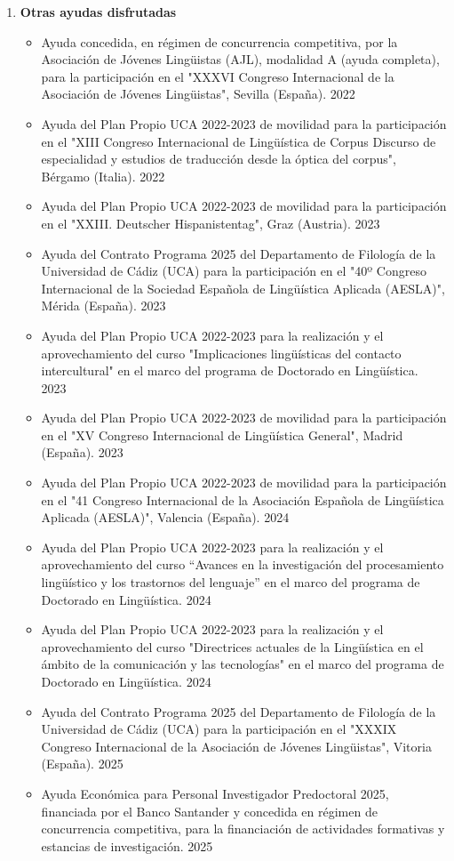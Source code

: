 \begin{enumerate}[label=\alph*)]
\begin{enumerate}[label=\alph*)]
\item \textbf{Otras ayudas disfrutadas}
\begin{itemize}
    \item Ayuda concedida, en régimen de concurrencia competitiva, por la Asociación de Jóvenes Lingüistas (AJL), modalidad A (ayuda completa), para la participación en el "XXXVI Congreso Internacional de la Asociación de Jóvenes Lingüistas", Sevilla (España). \hfill 2022
    \item Ayuda del Plan Propio UCA 2022-2023 de movilidad para la participación en el "XIII Congreso Internacional de Lingüística de Corpus Discurso de especialidad y estudios de traducción desde la óptica del corpus", Bérgamo (Italia). \hfill 2022
    \item Ayuda del Plan Propio UCA 2022-2023 de movilidad para la participación en el "XXIII. Deutscher Hispanistentag", Graz (Austria). \hfill 2023
    \item Ayuda del Contrato Programa 2025 del Departamento de Filología de la Universidad de Cádiz (UCA) para la participación en el "40º Congreso Internacional de la Sociedad Española de Lingüística Aplicada (AESLA)", Mérida (España). \hfill 2023
    \item Ayuda del Plan Propio UCA 2022-2023 para la realización y el aprovechamiento del curso "Implicaciones lingüísticas del contacto intercultural" en el marco del programa de Doctorado en Lingüística. \hfill 2023
    \item Ayuda del Plan Propio UCA 2022-2023 de movilidad para la participación en el "XV Congreso Internacional de Lingüística General", Madrid (España). \hfill 2023
    \item Ayuda del Plan Propio UCA 2022-2023 de movilidad para la participación en el "41 Congreso Internacional de la Asociación Española de Lingüística Aplicada (AESLA)", Valencia (España). \hfill 2024
    \item Ayuda del Plan Propio UCA 2022-2023 para la realización y el aprovechamiento del curso “Avances en la investigación del procesamiento lingüístico y los trastornos del lenguaje” en el marco del programa de Doctorado en Lingüística. \hfill 2024
    \item Ayuda del Plan Propio UCA 2022-2023 para la realización y el aprovechamiento del curso "Directrices actuales de la Lingüística en el ámbito de la comunicación y las tecnologías" en el marco del programa de Doctorado en Lingüística. \hfill 2024
    \item Ayuda del Contrato Programa 2025 del Departamento de Filología de la Universidad de Cádiz (UCA) para la participación en el "XXXIX Congreso Internacional de la Asociación de Jóvenes Lingüistas", Vitoria (España). \hfill 2025
    \item Ayuda Económica para Personal Investigador Predoctoral 2025, financiada por el Banco Santander y concedida en régimen de concurrencia competitiva, para la financiación de actividades formativas y estancias de investigación. \hfill 2025



\end{itemize}
\end{enumerate}
\end{enumerate}
